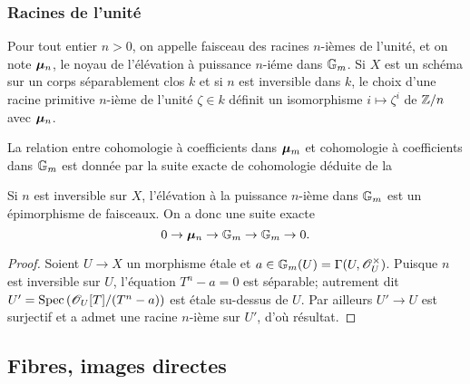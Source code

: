 \documentclass[oneside]{book}
\begin{document}
\subsubsection{Racines de l'unité}\label{I:2-2-4}

Pour tout entier $n>0$, on appelle faisceau des racines $n$-ièmes de 
l'unité, et on note ${\bm\mu}_n$, le noyau de l'élévation à puissance 
$n$-iéme dans $\mathbb{G}_m$. Si $X$ est un schéma sur un corps séparablement 
clos $k$ et si $n$ est inversible dans $k$, le choix d'une racine primitive 
$n$-ième de l'unité $\zeta\in k$ définit un isomorphisme 
$i\mapsto \zeta^i$ de $\mathbb{Z}/n$ avec ${\bm\mu}_n$. 

La relation entre cohomologie à coefficients dans ${\bm\mu}_m$ et cohomologie à 
coefficients dans $\mathbb{G}_m$ est donnée par la suite exacte de cohomologie déduite 
de la 






\begin{theorem}\label{I:2-2-5}
Si $n$ est inversible sur $X$, l'élévation à la puissance $n$-ième dans 
$\mathbb{G}_m$ est un épimorphisme de faisceaux. On a donc une suite exacte 
\[
  0 \to {\bm\mu}_n \to \mathbb{G}_m \to \mathbb{G}_m \to 0\text{.}
\]
\end{theorem}
\begin{proof}
Soient $U\to X$ un morphisme étale et $a\in \mathbb{G}_m(U) =\Gamma(U,\mathscr{O}_U^\times)$. 
Puisque $n$ est inversible sur $U$, l'équation $T^n-a = 0$ est séparable; 
autrement dit $U'=\operatorname{Spec}\left(\mathscr{O}_U[T]/(T^n-a)\right)$ est étale su-dessus de 
$U$. Par ailleurs $U'\to U$ est surjectif et a admet une racine $n$-ième sur 
$U'$, d'où résultat. 
\end{proof}










\subsection{Fibres, images directes}\label{I:2-3}





\subsubsection{}\label{I:2-3-1}
\end{document}
